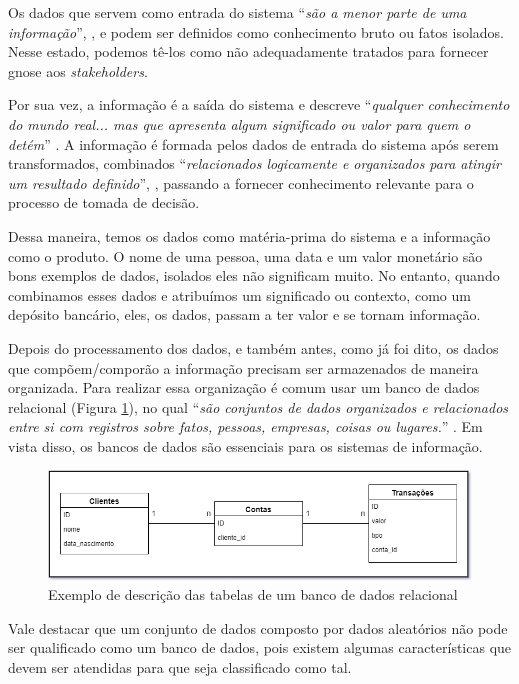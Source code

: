 Os dados que servem como entrada do sistema \enquote{\textit{são a menor parte de uma informação}}, \cite{boscarioli2016mineracao}, e podem ser definidos como conhecimento bruto ou fatos isolados. Nesse estado, podemos tê-los como não adequadamente tratados para fornecer gnose aos \textit{stakeholders}.

Por sua vez, a informação é a saída do sistema e descreve \enquote{\textit{qualquer conhecimento do mundo real... mas que apresenta algum significado ou valor para quem o detém}} \cite{boscarioli2016mineracao}. A informação é formada pelos dados de entrada do sistema após serem transformados, combinados \enquote{\textit{relacionados logicamente e organizados para atingir um resultado definido}}, \cite{vida2021datawarehouse}, passando a fornecer conhecimento relevante para o processo de tomada de decisão.

Dessa maneira, temos os dados como matéria-prima do sistema e a informação como o produto. O nome de uma pessoa, uma data e um valor monetário são bons exemplos de dados, isolados eles não significam muito. No entanto, quando combinamos esses dados e atribuímos um significado ou contexto, como um depósito bancário, eles, os dados, passam a ter valor e se tornam informação.

Depois do processamento dos dados, e também antes, como já foi dito, os dados que compõem/comporão a informação precisam ser armazenados de maneira organizada. Para realizar essa organização é comum usar um banco de dados relacional (Figura \ref{fig:bancoDadosRelacional}), no qual \enquote{\textit{são conjuntos de dados organizados e relacionados entre si com registros sobre fatos, pessoas, empresas, coisas ou lugares.}} \cite{rezende2015obi}. Em vista disso, os bancos de dados são essenciais para os sistemas de informação.

\begin{figure}[ht]
\centering
\includegraphics[width=1\textwidth]{imagens/banco-relacional.png}
\caption{Exemplo de descrição das tabelas de um banco de dados relacional}
\label{fig:bancoDadosRelacional}
\end{figure}

Vale destacar que um conjunto de dados composto por dados aleatórios não pode ser qualificado como um banco de dados, pois existem algumas características que devem ser atendidas para que seja classificado como tal.

